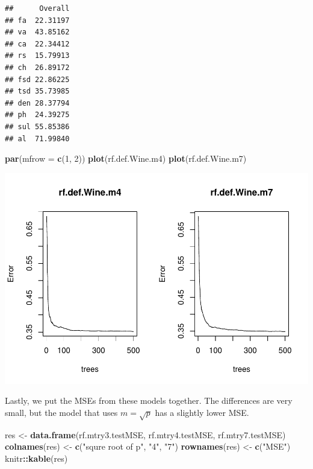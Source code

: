 \documentclass[
]{book}
\newenvironment{Shaded}{\begin{snugshade}}{\end{snugshade}}
\newcommand{\AttributeTok}[1]{\textcolor[rgb]{0.13,0.29,0.53}{#1}}
\newcommand{\DecValTok}[1]{\textcolor[rgb]{0.00,0.00,0.81}{#1}}
\newcommand{\FunctionTok}[1]{\textcolor[rgb]{0.13,0.29,0.53}{\textbf{#1}}}
\newcommand{\NormalTok}[1]{#1}
\newcommand{\OtherTok}[1]{\textcolor[rgb]{0.56,0.35,0.01}{#1}}
\newcommand{\SpecialCharTok}[1]{\textcolor[rgb]{0.81,0.36,0.00}{\textbf{#1}}}
\newcommand{\StringTok}[1]{\textcolor[rgb]{0.31,0.60,0.02}{#1}}
\begin{document}
\begin{verbatim}
##      Overall
## fa  22.31197
## va  43.85162
## ca  22.34412
## rs  15.79913
## ch  26.89172
## fsd 22.86225
## tsd 35.73985
## den 28.37794
## ph  24.39275
## sul 55.85386
## al  71.99840
\end{verbatim}

\begin{Shaded}
\begin{Highlighting}[]
\FunctionTok{par}\NormalTok{(}\AttributeTok{mfrow =} \FunctionTok{c}\NormalTok{(}\DecValTok{1}\NormalTok{, }\DecValTok{2}\NormalTok{))}
\FunctionTok{plot}\NormalTok{(rf.def.Wine.m4)}
\FunctionTok{plot}\NormalTok{(rf.def.Wine.m7)}
\end{Highlighting}
\end{Shaded}

\includegraphics{bookdown-demo_files/figure-latex/unnamed-chunk-17-1.pdf}

Lastly, we put the MSEs from these models together. The differences are very small, but the model that uses \(m=\sqrt{p}\) has a slightly lower MSE.

\begin{Shaded}
\begin{Highlighting}[]
\NormalTok{res }\OtherTok{\textless{}{-}} \FunctionTok{data.frame}\NormalTok{(rf.mtry3.testMSE, rf.mtry4.testMSE, rf.mtry7.testMSE)}
\FunctionTok{colnames}\NormalTok{(res) }\OtherTok{\textless{}{-}} \FunctionTok{c}\NormalTok{(}\StringTok{"squre root of p"}\NormalTok{, }\StringTok{"4"}\NormalTok{, }\StringTok{"7"}\NormalTok{)}
\FunctionTok{rownames}\NormalTok{(res) }\OtherTok{\textless{}{-}} \FunctionTok{c}\NormalTok{(}\StringTok{"MSE"}\NormalTok{)}
\NormalTok{knitr}\SpecialCharTok{::}\FunctionTok{kable}\NormalTok{(res)}
\end{Highlighting}
\end{Shaded}
\end{document}
